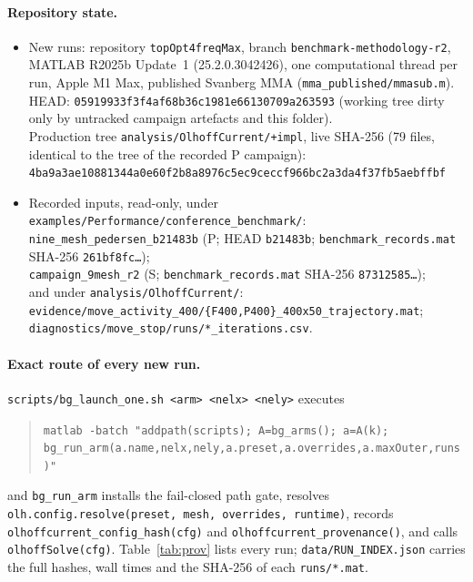 \documentclass[10pt,a4paper]{article}
\newcommand{\code}[1]{\texttt{\small #1}}
\begin{document}
\paragraph{Repository state.}
\begin{itemize}
\item New runs: repository \code{topOpt4freqMax}, branch \code{benchmark-methodology-r2}, MATLAB R2025b Update~1 (25.2.0.3042426), one computational thread per run, Apple M1 Max, published Svanberg MMA (\code{mma\_published/mmasub.m}).\\
HEAD: \code{05919933f3f4af68b36c1981e66130709a263593} (working tree dirty only by untracked campaign artefacts and this folder).\\
Production tree \code{analysis/OlhoffCurrent/+impl}, live SHA-256 (79 files, identical to the tree of the recorded P campaign):\\
\code{4ba9a3ae10881344a0e60f2b8a8976c5ec9ceccf966bc2a3da4f37fb5aebffbf}
\item Recorded inputs, read-only, under \code{examples/Performance/conference\_benchmark/}:\\
\code{nine\_mesh\_pedersen\_b21483b} (P; HEAD \code{b21483b}; \code{benchmark\_records.mat} SHA-256 \code{261bf8fc\ldots});\\
\code{campaign\_9mesh\_r2} (S; \code{benchmark\_records.mat} SHA-256 \code{87312585\ldots});\\
and under \code{analysis/OlhoffCurrent/}:\\
\code{evidence/move\_activity\_400/\{F400,P400\}\_400x50\_trajectory.mat};\\
\code{diagnostics/move\_stop/runs/*\_iterations.csv}.
\end{itemize}

\paragraph{Exact route of every new run.} \code{scripts/bg\_launch\_one.sh <arm> <nelx> <nely>} executes
\begin{quote}\small\code{matlab -batch "addpath(scripts); A=bg\_arms(); a=A(k);}\\ \code{bg\_run\_arm(a.name,nelx,nely,a.preset,a.overrides,a.maxOuter,runs)"}\end{quote}
and \code{bg\_run\_arm} installs the fail-closed path gate, resolves \code{olh.config.resolve(preset, mesh, overrides, runtime)}, records \code{olhoffcurrent\_config\_hash(cfg)} and \code{olhoffcurrent\_provenance()}, and calls \code{olhoffSolve(cfg)}. Table~\ref{tab:prov} lists every run; \code{data/RUN\_INDEX.json} carries the full hashes, wall times and the SHA-256 of each \code{runs/*.mat}.
\end{document}
